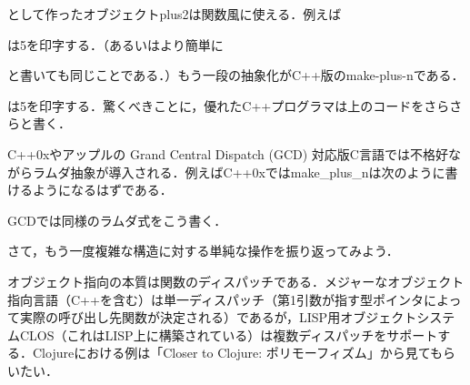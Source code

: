 \documentclass[a4paper,twocolumn]{jsbook}
\begin{document}

として作ったオブジェクトplus2は関数風に使える．例えば


は5を印字する．（あるいはより簡単に


と書いても同じことである．）もう一段の抽象化がC++版のmake-plus-nである．


は5を印字する．驚くべきことに，優れたC++プログラマは上のコードをさらさらと書く．

C++0xやアップルの Grand Central Dispatch (GCD) 対応版C言語では不格好ながらラムダ抽象が導入される．例えばC++0xではmake\_plus\_nは次のように書けるようになるはずである．


GCDでは同様のラムダ式をこう書く．


さて，もう一度複雑な構造に対する単純な操作を振り返ってみよう．

オブジェクト指向の本質は関数のディスパッチである．メジャーなオブジェクト指向言語（C++を含む）は単一ディスパッチ（第1引数が指す型ポインタによって実際の呼び出し先関数が決定される）であるが，LISP用オブジェクトシステムCLOS（これはLISP上に構築されている）は複数ディスパッチをサポートする．Clojureにおける例は「Closer to Clojure: ポリモーフィズム」から見てもらいたい．
\end{document}
